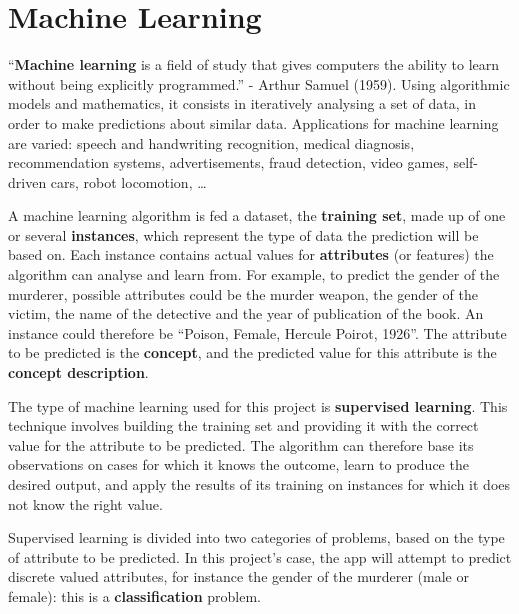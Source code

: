 \documentclass{mproj}
\begin{document}
\section{Machine Learning}\label{machine_learning}
``\textbf{Machine learning} is a field of study that gives computers the ability to learn without being explicitly programmed.'' - Arthur Samuel (1959). \cite{quotearthursamuel} Using algorithmic models and mathematics, it consists in iteratively analysing a set of data, in order to make predictions about similar data. Applications for machine learning are varied: speech and handwriting recognition, medical diagnosis, recommendation systems, advertisements, fraud detection, video games, self-driven cars, robot locomotion, \ldots \par 

A machine learning algorithm is fed a dataset, the \textbf{training set}, made up of one or several \textbf{instances}, which represent the type of data the prediction will be based on. Each instance contains actual values for \textbf{attributes} (or features) the algorithm can analyse and learn from. \cite{wekabook} For example, to predict the gender of the murderer, possible attributes could be the murder weapon, the gender of the victim, the name of the detective and the year of publication of the book. An instance could therefore be ``Poison, Female, Hercule Poirot, 1926''. The attribute to be predicted is the \textbf{concept}, and the predicted value for this attribute is the \textbf{concept description}. \par 

The type of machine learning used for this project is \textbf{supervised learning}. This technique involves building the training set and providing it with the correct value for the attribute to be predicted. \cite{machinelearningcourse} The algorithm can therefore base its observations on cases for which it knows the outcome, learn to produce the desired output, and apply the results of its training on instances for which it does not know the right value. \par

Supervised learning is divided into two categories of problems, based on the type of attribute to be predicted. In this project's case, the app will attempt to predict discrete valued attributes, for instance the gender of the murderer (male or female): this is a \textbf{classification} problem. 


\end{document}
